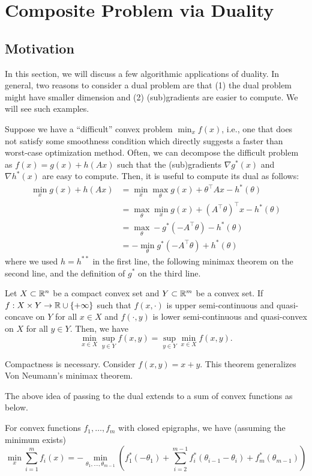
\section{Composite Problem via Duality}


\subsection{Motivation}

In this section, we will discuss a few algorithmic applications of
duality. In general, two reasons to consider a dual problem are that
(1) the dual problem might have smaller dimension and (2) (sub)gradients
are easier to compute. We will see such examples. 

Suppose we have a ``difficult'' convex problem $\min_{x}f(x)$,
i.e., one that does not satisfy some smoothness condition which directly
suggests a faster than worst-case optimization method. Often, we can
decompose the difficult problem as $f(x)=g(x)+h(Ax)$ such that the
(sub)gradients $\nabla g^{*}(x)$ and $\nabla h^{*}(x)$ are easy
to compute. Then, it is useful to compute its dual as follows:
\begin{align*}
\min_{x}g(x)+h(Ax) & =\min_{x}\max_{\theta}g(x)+\theta^{\top}Ax-h^{*}(\theta)\\
 & =\max_{\theta}\min_{x}g(x)+(A^{\top}\theta)^{\top}x-h^{*}(\theta)\\
 & =\max_{\theta}-g^{*}(-A^{\top}\theta)-h^{*}(\theta)\\
 & =-\min_{\theta}g^{*}(-A^{\top}\theta)+h^{*}(\theta)
\end{align*}
where we used $h=h^{**}$ in the first line, the following minimax
theorem on the second line, and the definition of $g^{*}$ on the
third line.
\begin{thm}
Let $X\subset\mathbb{R}^{n}$ be a compact convex set and $Y\subset\mathbb{R}^{m}$ be
a convex set. If $f:X\times Y\rightarrow\mathbb{R}\cup\{+\infty\}$ such that
$f(x,\cdot)$ is upper semi-continuous and quasi-concave on $Y$ for
all $x\in X$ and $f(\cdot,y)$ is lower semi-continuous and quasi-convex
on $X$ for all $y\in Y$. Then, we have
\[
\min_{x\in X}\sup_{y\in Y}f(x,y)=\sup_{y\in Y}\min_{x\in X}f(x,y).
\]
\end{thm}

\begin{rem*}
Compactness is necessary. Consider $f(x,y)=x+y$. This theorem generalizes
Von Neumann's minimax theorem. 
\end{rem*}
The above idea of passing to the dual extends to a sum of convex functions
as below.
\begin{lem}
\label{lem:dual-decomp}For convex functions $f_{1},\dots,f_{m}$
with closed epigraphs, we have (assuming the minimum exists)
\[
\min_{x}\sum^{m}_{i=1}f_{i}(x)=-\min_{\theta_{1},\ldots,\theta_{m-1}}\left(f^{*}_{1}(-\theta_{1})+\sum^{m-1}_{i=2}f^{*}_{i}(\theta_{i-1}-\theta_{i})+f^{*}_{m}(\theta_{m-1})\right)
\]
\end{lem}

